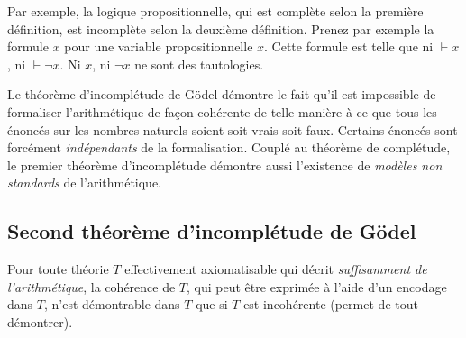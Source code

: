Par exemple, la logique propositionnelle, qui est complète selon la première définition, est incomplète selon la deuxième définition.
Prenez par exemple la formule $x$ pour une variable propositionnelle $x$. Cette formule est telle que ni $\vdash x$, ni $\vdash \neg x$. Ni $x$, ni $\neg x$ ne sont des tautologies.

Le théorème d'incomplétude de Gödel démontre le fait qu'il est impossible de formaliser l'arithmétique de façon cohérente de telle manière à ce que tous les énoncés sur les nombres naturels soient soit vrais soit faux.
Certains énoncés sont forcément \emph{indépendants} de la formalisation.
Couplé au théorème de complétude, le premier théorème d'incomplétude démontre aussi l'existence de \emph{modèles non standards} de l'arithmétique.

\subsection{Second théorème d'incomplétude de Gödel}

Pour toute théorie $T$ effectivement axiomatisable qui décrit \textit{suffisamment de l'arithmétique}, la cohérence de $T$, qui peut être exprimée à l'aide d'un encodage dans $T$, n'est démontrable dans $T$ que si $T$ est incohérente (permet de tout démontrer).
